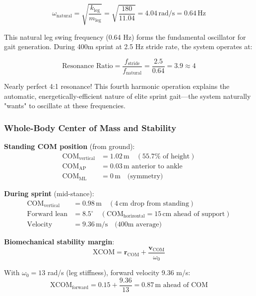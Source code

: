 \documentclass[11pt,onecolumn]{article}
\begin{document}
\begin{equation}
\omega_{\text{natural}} = \sqrt{\frac{k_{\text{leg}}}{m_{\text{leg}}}} = \sqrt{\frac{180}{11.04}} = 4.04\,\text{rad/s} = 0.64\,\text{Hz}
\end{equation}

This natural leg swing frequency (0.64 Hz) forms the fundamental oscillator for gait generation. During 400m sprint at 2.5 Hz stride rate, the system operates at:

\begin{equation}
\text{Resonance Ratio} = \frac{f_{\text{stride}}}{f_{\text{natural}}} = \frac{2.5}{0.64} = 3.9 \approx 4
\end{equation}

Nearly perfect 4:1 resonance! This fourth harmonic operation explains the automatic, energetically-efficient nature of elite sprint gait---the system naturally "wants" to oscillate at these frequencies.

\subsubsection{Whole-Body Center of Mass and Stability}

\textbf{Standing COM position} (from ground):
\begin{align}
\text{COM}_{\text{vertical}} &= 1.02\,\text{m} \quad (55.7\% \text{ of height}) \\
\text{COM}_{\text{AP}} &= 0.03\,\text{m anterior to ankle} \\
\text{COM}_{\text{ML}} &= 0\,\text{m} \quad \text{(symmetry)}
\end{align}

\textbf{During sprint} (mid-stance):
\begin{align}
\text{COM}_{\text{vertical}} &= 0.98\,\text{m} \quad (4\,\text{cm drop from standing}) \\
\text{Forward lean} &= 8.5^\circ \quad (\text{COM}_{\text{horizontal}} = 15\,\text{cm ahead of support}) \\
\text{Velocity} &= 9.36\,\text{m/s} \quad \text{(400m average)}
\end{align}

\textbf{Biomechanical stability margin}:
\begin{equation}
\text{XCOM} = \mathbf{r}_{\text{COM}} + \frac{\mathbf{v}_{\text{COM}}}{\omega_0}
\end{equation}

With $\omega_0 = 13$ rad/s (leg stiffness), forward velocity 9.36 m/s:
\begin{equation}
\text{XCOM}_{\text{forward}} = 0.15 + \frac{9.36}{13} = 0.87\,\text{m ahead of COM}
\end{equation}
\end{document}
